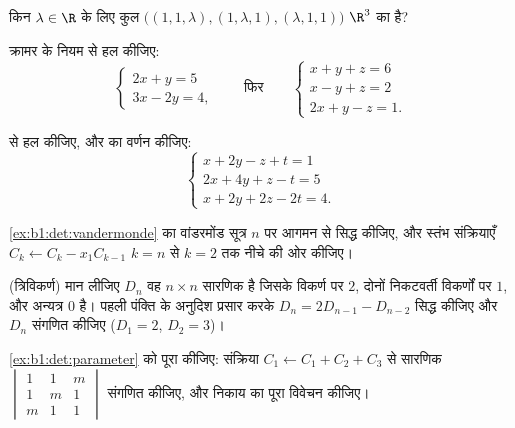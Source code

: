 \begin{exercise}[$\star$]\label{exo:b1:det:2}
किन $\lambda \in \R$ के लिए कुल $\bigl((1, 1, \lambda), (1, \lambda, 1),
(\lambda, 1, 1)\bigr)$ $\R^3$ का  है?
\end{exercise}

\begin{exercise}[$\star$]\label{exo:b1:det:3}
क्रामर के नियम से हल कीजिए:
\[
\begin{cases}
2x + y = 5\\
3x - 2y = 4 ,
\end{cases}
\qquad\text{फिर}\qquad
\begin{cases}
x + y + z = 6\\
x - y + z = 2\\
2x + y - z = 1 .
\end{cases}
\]
\end{exercise}

\begin{exercise}[$\star$]\label{exo:b1:det:4}
 से हल कीजिए, और  का वर्णन कीजिए:
\[
\begin{cases}
x + 2y - z + t = 1\\
2x + 4y + z - t = 5\\
x + 2y + 2z - 2t = 4 .
\end{cases}
\]
\end{exercise}

\begin{exercise}[$\star\star$]\label{exo:b1:det:5}
\cref{ex:b1:det:vandermonde} का वांडरमोंड सूत्र $n$ पर आगमन से सिद्ध कीजिए,
और स्तंभ संक्रियाएँ $C_k \leftarrow C_k - x_1 C_{k-1}$ $k = n$ से $k = 2$ तक
नीचे की ओर कीजिए।
\end{exercise}

\begin{exercise}[$\star\star$]\label{exo:b1:det:6}
(त्रिविकर्ण) मान लीजिए $D_n$ वह $n \times n$ सारणिक है जिसके विकर्ण पर $2$,
दोनों निकटवर्ती विकर्णों पर $1$, और अन्यत्र $0$ है। पहली पंक्ति के अनुदिश
प्रसार करके $D_n = 2D_{n-1} - D_{n-2}$ सिद्ध कीजिए और $D_n$ संगणित कीजिए
($D_1 = 2$, $D_2 = 3$)।
\end{exercise}

\begin{exercise}[$\star\star$]\label{exo:b1:det:7}
\cref{ex:b1:det:parameter} को पूरा कीजिए: संक्रिया $C_1 \leftarrow C_1 + C_2
+ C_3$ से सारणिक $\begin{vmatrix} 1 & 1 & m\\ 1 & m & 1\\ m & 1 &
1\end{vmatrix}$ संगणित कीजिए, और निकाय का पूरा विवेचन कीजिए।
\end{exercise}

